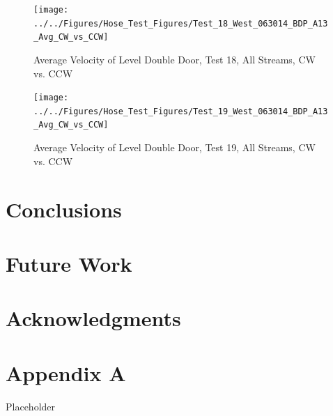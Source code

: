 \documentclass[12pt,oneside]{book}
\begin{document}
\clearpage

\begin{figure}[!ht]
\texttt{[image: ../../Figures/Hose\_Test\_Figures/Test\_18\_West\_063014\_BDP\_A13\_Avg\_CW\_vs\_CCW]}
\caption{Average Velocity of  Level Double Door, Test 18, All Streams, CW vs. CCW}
\label{fig:Test_18_BDP_A13_Avg_CW_vs_CCW}
\end{figure}

\clearpage

\begin{figure}[!ht]
\texttt{[image: ../../Figures/Hose\_Test\_Figures/Test\_19\_West\_063014\_BDP\_A13\_Avg\_CW\_vs\_CCW]}
\caption{Average Velocity of  Level Double Door, Test 19, All Streams, CW vs. CCW}
\label{fig:Test_19_BDP_A13_Avg_CW_vs_CCW}
\end{figure}

\clearpage

\chapter{Conclusions}
\label{chap:Conclusions}

\chapter{Future Work}
\label{chap:Future_Work}

\chapter{Acknowledgments}
\label{chap:Acknowledgments}



\appendix

\chapter{Appendix A}

Placeholder
\end{document}
